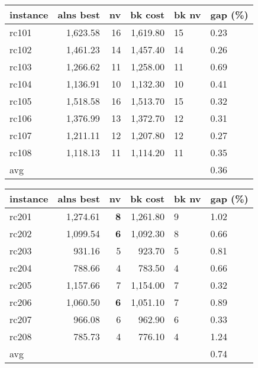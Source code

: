   \begin{table}[caption={Kết quả đo với tập Solomon RC1}, label=exp:solomonRC1]
    \centering
    \begin{tabular}{lrrrll}
    \hline
    instance & \multicolumn{1}{l}{alns best} & \multicolumn{1}{l}{nv} & \multicolumn{1}{l}{bk cost} & bk nv & gap (\%) \\ \hline
    rc101 & 1,623.58 & 16 & 1,619.80 & 15 & 0.23 \\ 
    rc102 & 1,461.23 & 14 & 1,457.40 & 14 & 0.26 \\ \hline
    rc103 & 1,266.62 & 11 & 1,258.00 & 11 & 0.69 \\ \hline
    rc104 & 1,136.91 & 10 & 1,132.30 & 10 & 0.41 \\ \hline
    rc105 & 1,518.58 & 16 & 1,513.70 & 15 & 0.32 \\ \hline
    rc106 & 1,376.99 & 13 & 1,372.70 & 12 & 0.31 \\ \hline
    rc107 & 1,211.11 & 12 & 1,207.80 & 12 & 0.27 \\ \hline
    rc108 & 1,118.13 & 11 & 1,114.20 & 11 & 0.35 \\ \hline
    avg &  &  &  &  & 0.36 \\ \hline
    \end{tabular}
  \end{table}

  \begin{table}[caption={Kết quả đo với tập Solomon RC2}, label=exp:solomonRC2]
    \centering
    \begin{tabular}{lrrrll}
    \hline
    instance & \multicolumn{1}{l}{alns best} & \multicolumn{1}{l}{nv} & \multicolumn{1}{l}{bk cost} & bk nv & gap (\%) \\ \hline
    rc201 & 1,274.61 & \textbf{8} & 1,261.80 & 9 & 1.02 \\ 
    rc202 & 1,099.54 & \textbf{6} & 1,092.30 & 8 & 0.66 \\ \hline
    rc203 & 931.16 & 5 & 923.70 & 5 & 0.81 \\ \hline
    rc204 & 788.66 & 4 & 783.50 & 4 & 0.66 \\ \hline
    rc205 & 1,157.66 & 7 & 1,154.00 & 7 & 0.32 \\ \hline
    rc206 & 1,060.50 & \textbf{6} & 1,051.10 & 7 & 0.89 \\ \hline
    rc207 & 966.08 & 6 & 962.90 & 6 & 0.33 \\ \hline
    rc208 & 785.73 & 4 & 776.10 & 4 & 1.24 \\ \hline
    avg &  &  &  &  & 0.74 \\ \hline
    \end{tabular}
  \end{table}